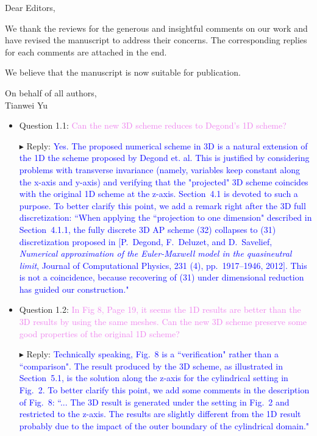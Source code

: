 \documentclass[a4paper, 10pt]{letter}
\begin{document}
\begin{letter}
\opening{Dear Editors,}

We thank the reviews for the generous and insightful comments on our work and have revised the manuscript to address their concerns. The corresponding replies for each comments are attached in the end.

We believe that the manuscript is now suitable for publication.

\closing{On behalf of all authors,\\ \vspace{1cm} Tianwei Yu}
\end{letter}


\newpage

\begin{itemize}
  \item Question 1.1: \textcolor{violet}{Can the new 3D scheme reduces to Degond's 1D scheme?}
  \item[$\blacktriangleright$] Reply: \textcolor{blue}{
  Yes. The proposed numerical scheme in 3D is a natural extension of the 1D
  the scheme proposed by Degond et. al. This is justified by considering problems with
  transverse invariance (namely, variables keep constant along the x-axis and y-axis) and
  verifying that the "projected" 3D scheme coincides with the original 1D scheme at the z-axis.
  Section~4.1 is devoted to such a purpose. To better clarify this point, we add a remark
  right after the 3D full discretization: ``When applying the ``projection to one dimension"
  described in Section~4.1.1, the fully discrete 3D AP scheme (32) collapses to (31)
  discretization proposed in $[$P.~Degond, F.~Deluzet, and D.~Savelief, \emph{Numerical approximation of the Euler-Maxwell model in the quasineutral limit}, Journal of Computational Physics, 231 (4), pp.~1917--1946, 2012$]$. This is not a coincidence, because
  recovering of (31) under dimensional reduction has guided our construction."
  }

  \item Question 1.2: \textcolor{violet}{In Fig 8, Page 19, it seems the 1D results are better than the 3D results by using the same meshes. Can the new 3D scheme
  preserve some good properties of the original 1D scheme?}
  \item[$\blacktriangleright$] Reply: \textcolor{blue}{
  Technically speaking, Fig.~8 is a ``verification" rather than a ``comparison".
  The result produced by the 3D scheme, as illustrated in Section~5.1, is the
  solution along the z-axis for the cylindrical setting in Fig.~2. To better
  clarify this point, we add some comments in the description of Fig.~8:
  ``... The 3D result is generated under the setting in Fig.~2
  and restricted to the z-axis. The results are slightly different from
  the 1D result probably due to the impact of the outer boundary of the
  cylindrical domain."
  }


\end{itemize}
\end{document}
